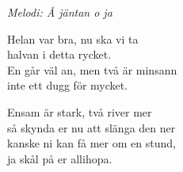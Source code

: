 {\footnotesize\textit{Melodi: Å jäntan o ja}}\par
\vspace{10pt}
Helan var bra, nu ska vi ta\\
halvan i detta rycket.\\
En går väl an, men två är minsann\\
inte ett dugg för mycket.\par
\vspace{10pt}
Ensam är stark, två river mer\\
så skynda er nu att slänga den ner\\ 
kanske ni kan få mer om en stund,\\
ja skål på er allihopa.
